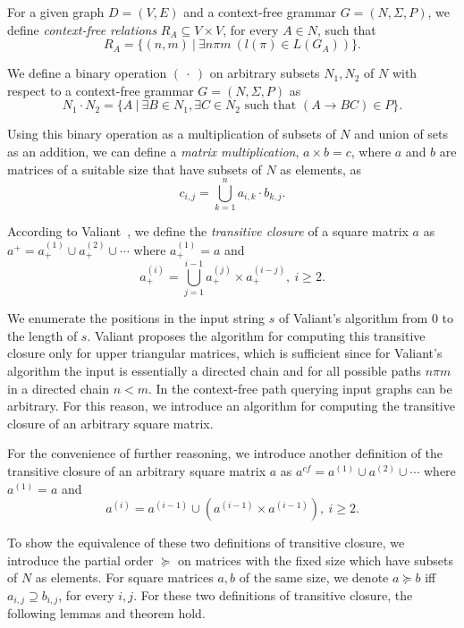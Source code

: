 For a given graph $D = (V, E)$ and a context-free grammar $G = (N, \Sigma, P)$, we define \textit{context-free relations} $R_A \subseteq V \times V$, for every $A \in N$, such that $$R_A = \{(n,m)~|~\exists n \pi m~(l(\pi) \in L(G_A))\}.$$

We define a binary operation $(~\cdot~)$ on arbitrary subsets $N_1 , N_2$ of $N$ with respect to a context-free grammar $G = (N, \Sigma, P)$ as $$N_1 \cdot N_2 = \{A~|~\exists B \in N_1, \exists C \in N_2 \text{ such that }(A \rightarrow B C) \in P\}.$$

Using this binary operation as a multiplication of subsets of $N$ and union of sets as an addition, we can define a \textit{matrix multiplication}, $a \times b = c$, where $a$ and $b$ are matrices of a suitable size that have subsets of $N$ as elements, as $$c_{i,j} = \bigcup^{n}_{k=1}{a_{i,k} \cdot b_{k,j}}.$$

According to Valiant~\cite{valiant}, we define the \textit{transitive closure} of a square matrix $a$ as $a^+ = a^{(1)}_+ \cup a^{(2)}_+ \cup \cdots$ where $a^{(1)}_+ = a$ and $$a^{(i)}_+ = \bigcup^{i-1}_{j=1}{a^{(j)}_+ \times a^{(i-j)}_+}, ~i \ge 2.$$

We enumerate the positions in the input string $s$ of Valiant's algorithm from 0 to the length of $s$. Valiant proposes the algorithm for computing this transitive closure only for upper triangular matrices, which is sufficient since for Valiant's algorithm the input is essentially a directed chain and for all possible paths $n \pi m$ in a directed chain $n < m$. In the context-free path querying input graphs can be arbitrary. For this reason, we introduce an algorithm for computing the transitive closure of an arbitrary square matrix.

For the convenience of further reasoning, we introduce another definition of the transitive closure of an arbitrary square matrix $a$ as $a^{cf} = a^{(1)} \cup a^{(2)} \cup \cdots$ where $a^{(1)} = a$ and $$a^{(i)} = a^{(i-1)} \cup (a^{(i-1)} \times a^{(i-1)}), ~i \ge 2.$$

To show the equivalence of these two definitions of transitive closure, we introduce the partial order $\succeq$ on matrices with the fixed size which have subsets of $N$ as elements. For square matrices $a, b$ of the same size, we denote $a \succeq b$ iff $a_{i,j} \supseteq b_{i,j}$, for every $i, j$. For these two definitions of transitive closure, the following lemmas and theorem hold.

